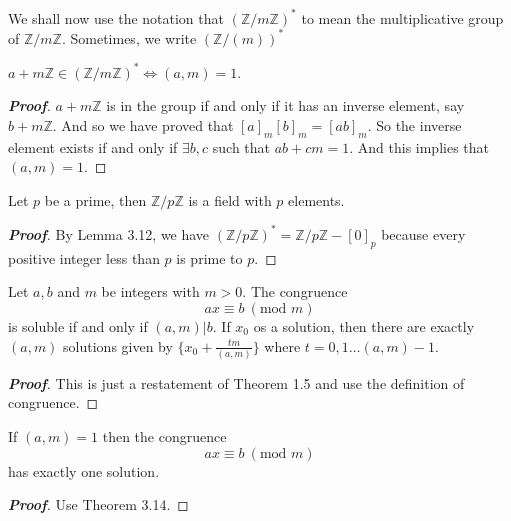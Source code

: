 We shall now use the notation that $(\mathbb{Z}/m \mathbb{Z})^{*}$ to mean the multiplicative group of $\mathbb{Z}/m \mathbb{Z}$. Sometimes, we write $(\mathbb{Z}/(m))^{*}$
\begin{lemma} $a+m\mathbb{Z} \in (\mathbb{Z}/m \mathbb{Z})^{*} \iff (a,m)=1$.
\end{lemma}
\begin{proof}[\bf Proof] $a+m\mathbb{Z}$ is in the group if and only if it has an inverse element, say $b+m\mathbb{Z}$. And so we have proved that $[a]_m [b]_m=[ab]_m$. So the inverse element exists if and only if $\exists b,c$ such that $ab+cm=1$. And this implies that $(a,m)=1$.
\end{proof}
\begin{corollary} Let $p$ be a prime, then $\mathbb{Z}/p\mathbb{Z}$ is a field with $p$ elements.
\end{corollary}
\begin{proof}[\bf Proof] By Lemma 3.12, we have $(\mathbb{Z}/p\mathbb{Z})^{*}=\mathbb{Z}/p\mathbb{Z} - [0]_p$ because every positive integer less than $p$ is prime to $p$.
\end{proof}
\begin{theorem} Let $a,b$ and $m$ be integers with $m>0$. The congruence
\begin{equation*} ax \equiv b ~(\text{mod } m) \end{equation*}
is soluble if and only if $(a,m)|b$. If $x_0$ os a solution, then there are exactly $(a,m)$ solutions given by $\{x_0 + \frac{tm}{(a,m)}\}$ where $t=0,1 \ldots (a,m)-1$.
\end{theorem}
\begin{proof}[\bf Proof] This is just a restatement of Theorem 1.5 and use the definition of congruence.
\end{proof}
\begin{corollary} If $(a,m)=1$ then the congruence
\begin{equation*} ax \equiv b~(\text{mod } m) \end{equation*}
has exactly one solution.
\end{corollary}
\begin{proof}[\bf Proof] Use Theorem 3.14.
\end{proof}
